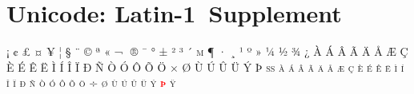 

\presection\section*{\quad Unicode: Latin-1~Supplement\marginpar{\vspace{.25em}\checkmeh}}\postsection

\def\myred{red} %

\textsc{¡ ¢ £ ¤ ¥ ¦ § ¨ © ª « ¬ ­ ® ¯ ° ± ² ³ ´ µ ¶ · ¸ ¹ º » ¼ ½ ¾ 
¿ À Á Â Ã Ä Å Æ Ç È É Ê Ë Ì Í Î Ï Ð Ñ Ò Ó Ô Õ Ö × Ø Ù Ú Û Ü Ý Þ ß 
à á â ã ä å æ ç è é ê ë ì í î ï ð ñ ò ó ô õ ö ÷ ø ù ú û ü ý \textcolor{\myred}{\textbf{þ}} ÿ
}
